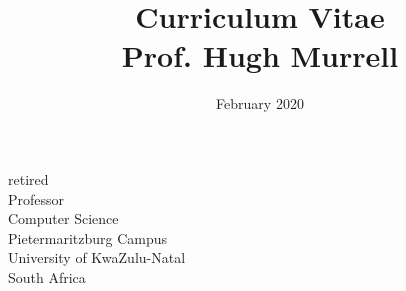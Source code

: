 \documentclass[12pt]{article}
\title{ Curriculum Vitae \\
       Prof. Hugh Murrell \\
        \vspace{0.5cm} }
\date{February 2020}
\begin{document}
\maketitle


\begin{figure}[ht]
\end{figure}
\begin{flushright}
\vspace{1.5cm}
retired \\
Professor \\ 
Computer Science \\ 
Pietermaritzburg Campus \\
University of KwaZulu-Natal \\
South Africa \\

\end{flushright}

\newpage


\newpage

\newpage

\newpage

\newpage





\newpage

\newpage

\end{document}
